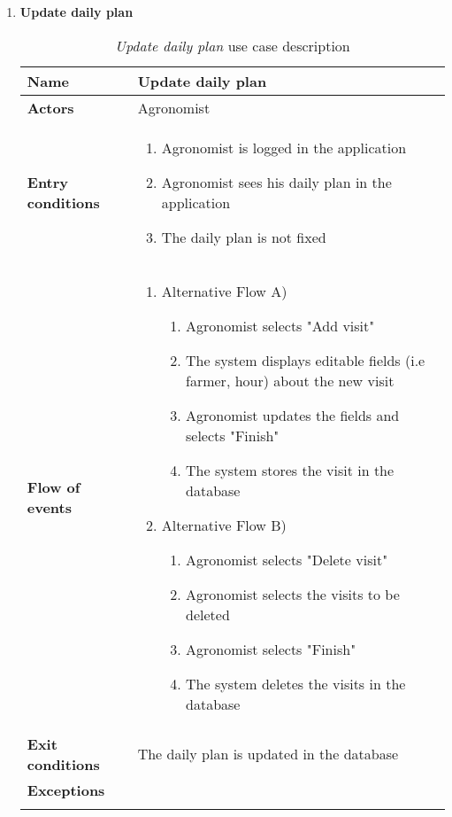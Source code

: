 \begin{enumerate}
			\item \textbf{Update daily plan}
				\begin{longtable}{p{0.26\linewidth}p{0.75\linewidth}}
					\toprule
					\textbf{Name} & \textbf{Update daily plan} \\
					\midrule
					\textbf{Actors} & Agronomist \\
					\midrule
					\textbf{Entry conditions} & \begin{enumerate}
						\item Agronomist is logged in the application
						\item Agronomist sees his daily plan in the application
						\item The daily plan is not fixed
					\end{enumerate} \\
					\midrule
					\textbf{Flow of events} & 
					\begin{enumerate}
						\item Alternative Flow A)
						\begin{enumerate}
							\item Agronomist selects "Add visit"
							\item The system displays editable fields (i.e farmer, hour) about the new visit
							\item Agronomist updates the fields and selects "Finish"
							\item The system stores the visit in the database
						\end{enumerate}
						\item Alternative Flow B)
						\begin{enumerate}
							\item Agronomist selects "Delete visit"
							\item Agronomist selects the visits to be deleted 
							\item Agronomist selects "Finish"
							\item The system deletes the visits in the database
						\end{enumerate}
					\end{enumerate} \\
					\midrule
					\textbf{Exit conditions} & The daily plan is updated in the database \\
					\midrule
					\textbf{Exceptions} &  \\
					\bottomrule
					\caption{\emph{Update daily plan} use case description}
				\end{longtable}
			

\end{enumerate}
